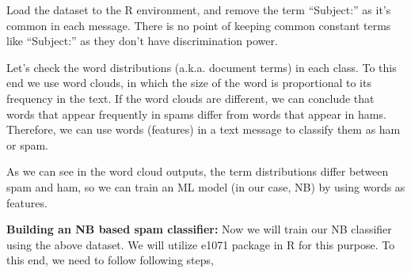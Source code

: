 \documentclass[]{article}
\newenvironment{Shaded}{\begin{snugshade}}{\end{snugshade}}
\newcommand{\CommentTok}[1]{\textcolor[rgb]{0.56,0.35,0.01}{\textit{#1}}}
\newcommand{\DecValTok}[1]{\textcolor[rgb]{0.00,0.00,0.81}{#1}}
\newcommand{\KeywordTok}[1]{\textcolor[rgb]{0.13,0.29,0.53}{\textbf{#1}}}
\newcommand{\NormalTok}[1]{#1}
\newcommand{\OperatorTok}[1]{\textcolor[rgb]{0.81,0.36,0.00}{\textbf{#1}}}
\newcommand{\StringTok}[1]{\textcolor[rgb]{0.31,0.60,0.02}{#1}}
\begin{document}
Load the dataset to the R environment, and remove the term ``Subject:''
as it's common in each message. There is no point of keeping common
constant terms like ``Subject:'' as they don't have discrimination
power.

\begin{Shaded}
\end{Shaded}

Let's check the word distributions (a.k.a. document terms) in each
class. To this end we use word clouds, in which the size of the word is
proportional to its frequency in the text. If the word clouds are
different, we can conclude that words that appear frequently in spams
differ from words that appear in hams. Therefore, we can use words
(features) in a text message to classify them as ham or spam.

\begin{Shaded}
\end{Shaded}

As we can see in the word cloud outputs, the term distributions differ
between spam and ham, so we can train an ML model (in our case, NB) by
using words as features.

\textbf{Building an NB based spam classifier:} Now we will train our NB
classiﬁer using the above dataset. We will utilize e1071 package in R
for this purpose. To this end, we need to follow following steps,
\end{document}
